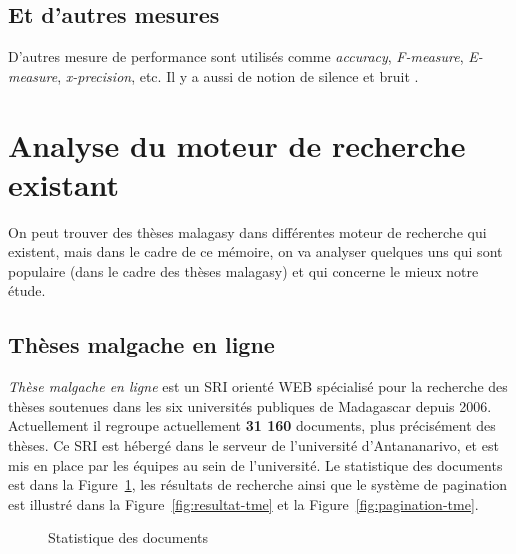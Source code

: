 \subsection{Et d'autres mesures}
D'autres mesure de performance sont utilisés comme \textit{accuracy}, \textit{F-measure}, \textit{E-measure}, \textit{x-precision}, etc. Il y a aussi de notion de silence et bruit \citep*{modern-ir, amelioration-ri-approche-semantique}.

\section{Analyse du moteur de recherche existant}
On peut trouver des thèses malagasy dans différentes moteur de recherche qui existent, mais dans le cadre de ce mémoire, on va analyser quelques uns qui sont populaire (dans le cadre des thèses malagasy) et qui concerne le mieux notre étude.

\subsection{Thèses malgache en ligne}
\emph{Thèse malgache en ligne} \citep{these-malgache-en-ligne} est un SRI orienté WEB spécialisé pour la recherche des thèses soutenues dans les six universités publiques de Madagascar depuis 2006. Actuellement il regroupe actuellement \textbf{31 160} documents, plus précisément des thèses. Ce SRI est hébergé dans le serveur de l'université d'Antananarivo, et est mis en place par les équipes au sein de l'université. Le statistique des documents est dans la Figure~\ref{fig:statistic-tme}, les résultats de recherche ainsi que le système de pagination est illustré dans la Figure~\ref{fig:resultat-tme} et la Figure~\ref{fig:pagination-tme}.

\begin{figure}[htbp]
	\begin{center}
	\end{center}
	\caption{Statistique des documents \citep{these-malgache-en-ligne}}\label{fig:statistic-tme}
\end{figure}

